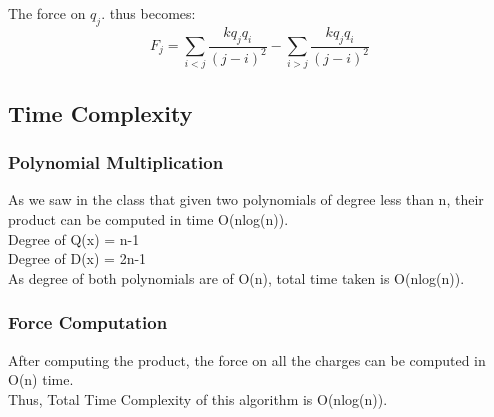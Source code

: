 \documentclass{article}
\begin{document}
The force on $q_j$. thus becomes: 
$$ F_j = \sum_{i<j}\frac{kq_jq_i}{(j-i)^{2}} - \sum_{i>j}\frac{kq_jq_i}{(j-i)^{2}}$$ 

\subsection{Time Complexity}
\subsubsection{Polynomial Multiplication}
As we saw in the class that given two polynomials of degree less than n, their product can be computed in time O(nlog(n)).\\
Degree of Q(x) = n-1\\
Degree of D(x) = 2n-1\\
As degree of both polynomials are of O(n), total time taken is O(nlog(n)).

\subsubsection{Force Computation}
After computing the product, the force on all the charges can be computed in O(n) time.\\
Thus, Total Time Complexity of this algorithm is O(nlog(n)).
\end{document}
